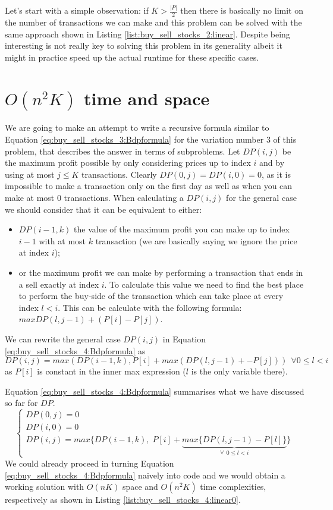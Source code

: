 Let's start with a simple observation: if $K > \frac{|P|}{2}$ then there is basically no limit on the number of transactions we can make and this problem can be solved with the same approach shown in Listing \ref{list:buy_sell_stocks_2:linear}.
Despite being interesting is not really key to solving this problem in its generality albeit it might in practice speed up the actual runtime for these specific cases.


\section{$O(n^2K)$ time and space}
\label{buy_sell_stocks4:sec:linerartime1}
We are going to make an attempt to write a recursive formula similar to Equation \ref{eq:buy_sell_stocks_3:Bdpformula} for the variation number $3$ of this problem, that describes the answer in terms of subproblems.
Let $DP(i,j)$ be the maximum profit possible by only considering prices up to index $i$ and by using at most $j \leq K$ transactions.
Clearly $DP(0,j)=DP(i,0)=0$, as it is impossible to make a transaction only on the first day as well as when you can make at most $0$ transactions.
When calculating a $DP(i,j)$ for the general case we should consider that it can be equivalent to either:
\begin{itemize}
    \item $DP(i-1,k)$ the value of the maximum profit you can make up to index $i-1$ with at most $k$ transaction (we are basically saying we ignore the price at index $i$);
    \item or the maximum profit we can make by performing a transaction that ends in a sell exactly at index $i$. To calculate this value we need to find the best place to perform the buy-side of the transaction which can take place at every index $l < i$. This can be calculate with the following formula: $max DP(l,j-1) + (P[i]-P[j])$.
\end{itemize}
We can rewrite the general case $DP(i,j)$ in Equation \ref{eq:buy_sell_stocks_4:Bdpformula} as 
$$DP(i,j) = max(DP(i-1,k), P[i] + max(DP(l,j-1)+-P[j])) \: \: \forall 0 \leq l < i$$ as $P[i]$ is constant in the inner max expression ($l$ is the only variable there).

Equation \ref{eq:buy_sell_stocks_4:Bdpformula} summarises what we have discussed so far for $DP$.
\begin{equation}
    \begin{cases}
        DP(0,j) = 0 \\
        DP(i,0) = 0 \\
        DP(i,j) = max\Big\{DP(i-1,k), \; P[i] + \underbrace{max\big\{DP(l,j-1)-P[l]\big\}}_{\forall \: \: 0 \leq l < i}\Big\}
     \end{cases}
    \label{eq:buy_sell_stocks_4:Bdpformula}
\end{equation}
We could already proceed in turning Equation \ref{eq:buy_sell_stocks_4:Bdpformula} naively into code and we would obtain a working solution with $O(nK)$ space and $O(n^2K)$ time complexities, respectively as shown in Listing \ref{list:buy_sell_stocks_4:linear0}.


